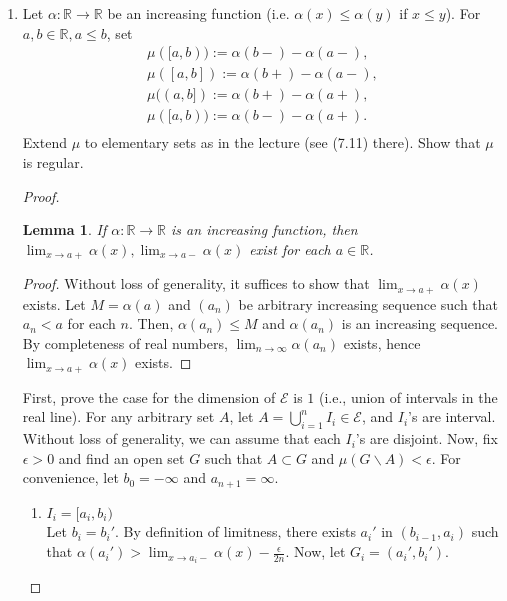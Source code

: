 \documentclass{article}
\newtheorem{lemma}{Lemma}
\begin{document}
\begin{enumerate}[font = \Large\bfseries\itshape\space, leftmargin = 3mm, labelsep = 3mm]
\item
Let $\alpha: \mathbb{R} \rightarrow \mathbb{R}$ be an increasing function (i.e. $\alpha(x) \leq \alpha(y)$ if $x \leq y$).
For $a,b \in \mathbb{R}, a \leq b$, set
$$
\begin{aligned}
\mu([a,b)) := \alpha(b-) - \alpha(a-),\\
\mu([a,b]) := \alpha(b+) - \alpha(a-),\\
\mu((a,b]) := \alpha(b+) - \alpha(a+),\\
\mu([a,b)) := \alpha(b-) - \alpha(a+).\\
\end{aligned}
$$
Extend $\mu$ to elementary sets as in the lecture (see (7.11) there).
Show that $\mu$ is regular.
\begin{proof}
\begin{lemma}
If $\alpha: \mathbb{R} \rightarrow \mathbb{R}$ is an increasing function, then $\lim_{x\rightarrow a+} \alpha(x), \lim_{x\rightarrow a-} \alpha(x)$ exist for each $a \in \mathbb{R}$.
\end{lemma}

\begin{proof}
Without loss of generality, it suffices to show that $\lim_{x\rightarrow a+} \alpha(x)$ exists.
Let $M = \alpha(a)$ and $(a_n)$ be arbitrary increasing sequence such that $a_n < a$ for each $n$.
Then, $\alpha(a_n) \leq M$ and $\alpha(a_n)$ is an increasing sequence.
By completeness of real numbers, $\lim_{n\rightarrow\infty}\alpha(a_n)$ exists, hence $\lim_{x\rightarrow a+} \alpha(x)$ exists.
\end{proof}

First, prove the case for the dimension of $\mathcal{E}$ is $1$ (i.e., union of intervals in the real line).
For any arbitrary set $A$, let $A = \bigcup_{i=1}^n I_i \in \mathcal{E}$, and $I_i$'s are interval.
Without loss of generality, we can assume that each $I_i$'s are disjoint.
Now, fix $\epsilon > 0$ and find an open set $G$ such that $A \subset G$ and $\mu(G \backslash A) < \epsilon$.
For convenience, let $b_0 = -\infty$ and $a_{n+1} = \infty$.
\begin{enumerate}[label = Case \arabic*:]
\item $I_i = [a_i, b_i)$\\
Let $b_i = b_i'$.
By definition of limitness, there exists $a_i'$ in $(b_{i-1}, a_i)$ such that $\alpha(a_i') > \lim_{x\rightarrow a_i -}\alpha(x) - \frac{\epsilon}{2n}$.
Now, let $G_i = (a_i', b_i')$.


\end{enumerate}
\end{proof}
\end{enumerate}
\end{document}
